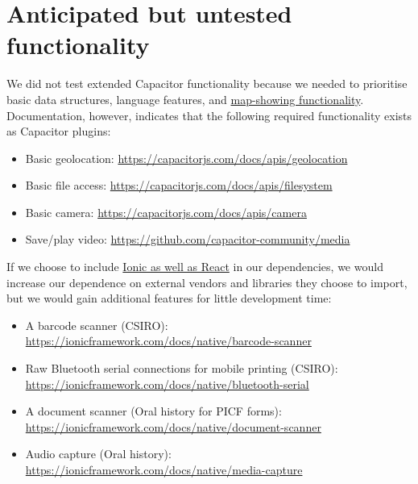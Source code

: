 \documentclass[a4paper,headings=small fontsize=10pt]{scrreprt}
\begin{document}
\section{Anticipated but untested functionality
}

We did not test extended Capacitor functionality because we needed to
prioritise basic data structures, language features, and
\href{https://capacitorjs.com/docs/plugins/community}{{map-showing
functionality}}. Documentation, however, indicates that the following
required functionality exists as Capacitor plugins:

\begin{itemize}
\item Basic geolocation:
  \href{https://capacitorjs.com/docs/apis/geolocation}{{https://capacitorjs.com/docs/apis/geolocation}}
 
\item Basic file access:
  \href{https://capacitorjs.com/docs/apis/filesystem}{{https://capacitorjs.com/docs/apis/filesystem}}
 
\item Basic camera:
  \href{https://capacitorjs.com/docs/apis/camera}{{https://capacitorjs.com/docs/apis/camera}}
 
\item Save/play video:
  \href{https://github.com/capacitor-community/media}{{https://github.com/capacitor-community/media}}
 
\end{itemize}

If we choose to include
\href{https://www.smashingmagazine.com/2019/08/building-mobile-apps-ionic-react/}{{Ionic
as well as React}} in our dependencies, we would increase our dependence
on external vendors and libraries they choose to import, but we would
gain additional features for little development time:

\begin{itemize}
\item A barcode scanner (CSIRO):
  \href{https://ionicframework.com/docs/native/barcode-scanner}{{https://ionicframework.com/docs/native/barcode-scanner}}
 
\item Raw Bluetooth serial connections for mobile printing (CSIRO):
  \href{https://ionicframework.com/docs/native/bluetooth-serial}{{https://ionicframework.com/docs/native/bluetooth-serial}}
 
\item A document scanner (Oral history for PICF forms):
  \href{https://ionicframework.com/docs/native/document-scanner}{{https://ionicframework.com/docs/native/document-scanner}}
 
\item Audio capture (Oral history):
  \href{https://ionicframework.com/docs/native/media-capture}{{https://ionicframework.com/docs/native/media-capture}}
 
\end{itemize}
\end{document}
